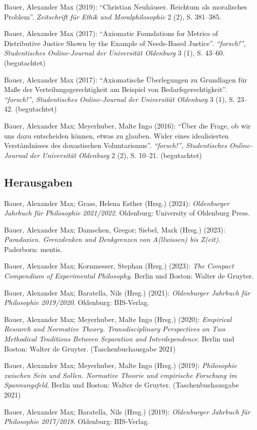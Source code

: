 \documentclass[a4paper,10pt]{article}
\newenvironment{literature}{%
   \parskip6pt\parindent0pt\raggedright
   \def\lititem{\hangindent=1cm\hangafter1}}{%
   \par\ignorespaces}
\begin{document}
\begin{literature}
\lititem Bauer, Alexander Max (2019): \enquote{Christian Neuhäuser. Reichtum als moralisches Problem}. \textit{Zeitschrift für Ethik und Moralphilosophie} 2 (2), S. 381--385.

\lititem Bauer, Alexander Max (2017): \enquote{Axiomatic Foundations for Metrics of Distributive Justice Shown by the Example of Needs-Based Justice}. \textit{\enquote{forsch!}, Studentisches Online-Journal der Universität Oldenburg} 3 (1), S. 43--60. (begutachtet)

\lititem Bauer, Alexander Max (2017): \enquote{Axiomatische Überlegungen zu Grundlagen für Maße der Verteilungsgerechtigkeit am Beispiel von Bedarfsgerechtigkeit}. \textit{\enquote{forsch!}, Studentisches Online-Journal der Universität Oldenburg} 3 (1), S. 23--42. (begutachtet)

\lititem Bauer, Alexander Max; Meyerhuber, Malte Ingo (2016): \enquote{Über die Frage, ob wir uns dazu entscheiden können, etwas zu glauben. Wider eines idealisierten Verständnisses des doxastischen Voluntarismus}. \textit{\enquote{forsch!}, Studentisches Online-Journal der Universität Oldenburg} 2 (2), S. 10--21. (begutachtet)
\end{literature}

\subsection*{Herausgaben}
\begin{literature}
\lititem Bauer, Alexander Max; Grass, Helena Esther (Hrsg.) (2024): \textit{Oldenburger Jahrbuch für Philosophie 2021/2022}. Oldenburg: University of Oldenburg Press.

\lititem Bauer, Alexander Max; Damschen, Gregor; Siebel, Mark (Hrsg.) (2023): \textit{Paradoxien. Grenzdenken und Denkgrenzen von A(llwissen) bis Z(eit)}. Paderborn: mentis.

\lititem Bauer, Alexander Max; Kornmesser, Stephan (Hrsg.) (2023): \textit{The Compact Compendium of Experimental Philosophy}. Berlin und Boston: Walter de Gruyter.

\lititem Bauer, Alexander Max; Baratella, Nils (Hrsg.) (2021): \textit{Oldenburger Jahrbuch für Philosophie 2019/2020}. Oldenburg: BIS-Verlag.

\lititem Bauer, Alexander Max; Meyerhuber, Malte Ingo (Hrsg.) (2020): \textit{Empirical Research and Normative Theory. Transdisciplinary Perspectives on Two Methodical Traditions Between Separation and Interdependence}. Berlin und Boston: Walter de Gruyter. (Taschenbuchausgabe 2021)

\lititem Bauer, Alexander Max; Meyerhuber, Malte Ingo (Hrsg.) (2019): \textit{Philosophie zwischen Sein und Sollen. Normative Theorie und empirische Forschung im Spannungsfeld}. Berlin und Boston: Walter de Gruyter. (Taschenbuchausgabe 2021)

\lititem Bauer, Alexander Max; Baratella, Nils (Hrsg.) (2019): \textit{Oldenburger Jahrbuch für Philosophie 2017/2018}. Oldenburg: BIS-Verlag.
\end{literature}
\end{document}
